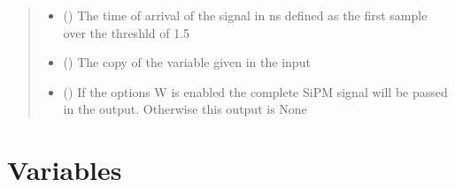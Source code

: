 \documentclass[letterpaper,10pt,english]{sphinxmanual}
\begin{document}
\begin{fulllineitems}
\begin{quote}
\begin{description}
\begin{itemize}
\item {} 
 () \textendash{} The time of arrival of the signal in ns defined as the first sample over the threshld of 1.5

\item {} 
 () \textendash{} The copy of the  variable given in the input

\item {} 
 () \textendash{} If the options \sphinxhyphen{}W is enabled the complete SiPM signal will be passed in the output.
Otherwise this output is None

\end{itemize}


\end{description}\end{quote}

\end{fulllineitems}



\section{Variables}
\label{\detokenize{structure:variables}}
\end{document}

